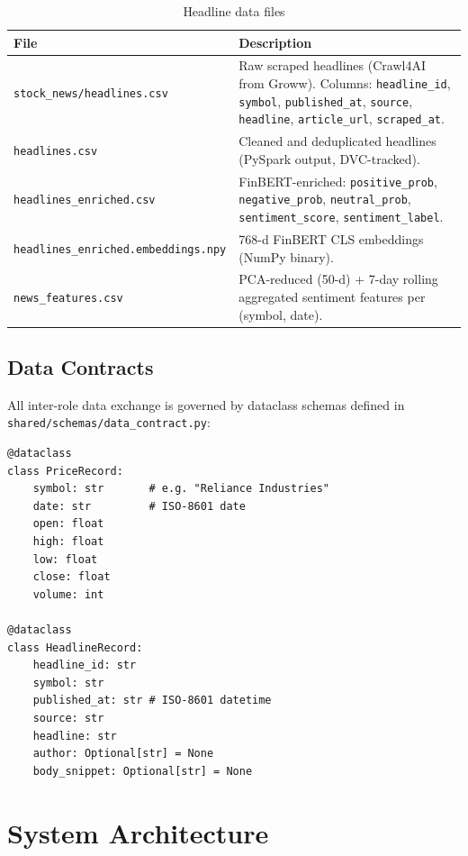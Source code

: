 \documentclass[11pt,a4paper]{article}
\begin{document}
\begin{table}[H]
\centering
\caption{Headline data files}
\begin{tabular}{@{}lp{9cm}@{}}
\toprule
\textbf{File} & \textbf{Description} \\
\midrule
\texttt{stock\_news/headlines.csv} & Raw scraped headlines (Crawl4AI from Groww).
  Columns: \texttt{headline\_id}, \texttt{symbol}, \texttt{published\_at},
  \texttt{source}, \texttt{headline}, \texttt{article\_url},
  \texttt{scraped\_at}. \\
\texttt{headlines.csv} & Cleaned and deduplicated headlines (PySpark output, DVC-tracked). \\
\texttt{headlines\_enriched.csv} & FinBERT-enriched: \texttt{positive\_prob},
  \texttt{negative\_prob}, \texttt{neutral\_prob}, \texttt{sentiment\_score},
  \texttt{sentiment\_label}. \\
\texttt{headlines\_enriched.embeddings.npy} & 768-d FinBERT CLS embeddings
  (NumPy binary). \\
\texttt{news\_features.csv} & PCA-reduced (50-d) + 7-day rolling aggregated
  sentiment features per (symbol, date). \\
\bottomrule
\end{tabular}
\end{table}

\subsection{Data Contracts}

All inter-role data exchange is governed by dataclass schemas defined in
\texttt{shared/schemas/data\_contract.py}:

\begin{lstlisting}[style=python, caption={Core data-contract schemas}]
@dataclass
class PriceRecord:
    symbol: str       # e.g. "Reliance Industries"
    date: str         # ISO-8601 date
    open: float
    high: float
    low: float
    close: float
    volume: int

@dataclass
class HeadlineRecord:
    headline_id: str
    symbol: str
    published_at: str # ISO-8601 datetime
    source: str
    headline: str
    author: Optional[str] = None
    body_snippet: Optional[str] = None
\end{lstlisting}


\section{System Architecture}
\end{document}
